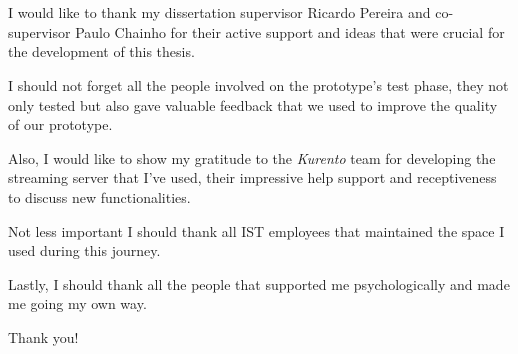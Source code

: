 \chapter*{\acknowledgments}


I would like to thank my dissertation supervisor Ricardo Pereira and co-supervisor Paulo Chainho for their active support and ideas that were crucial for the development of this thesis.

I should not forget all the people involved on the prototype's test phase, they not only tested but also gave valuable feedback that we used to improve the quality of our prototype. 

Also, I would like to show my gratitude to the \emph{Kurento} team for developing the streaming server that I've used, their impressive help support and receptiveness to discuss new functionalities.   

Not less important I should thank all IST employees that maintained the space I used during this journey.

Lastly, I should thank all the people that supported me psychologically and made me going my own way. 

Thank you!

\cleardoublepage